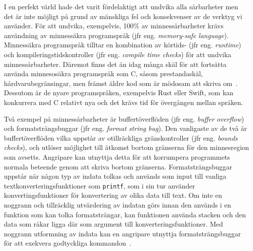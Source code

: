 I en perfekt värld hade det varit fördelaktigt att undvika alla sårbarheter men
det är inte möjligt på grund av mänskliga fel och konsekvenser av de verktyg vi
använder. För att undvika, exempelvis, 100\% av minnessårbarheter krävs
användning av minnessäkra programspråk (jfr eng. \emph{memory-safe language}).
Minnessäkra programspråk tilltar en kombination av körtids- (jfr eng.
\emph{runtime}) och kompileringstidskontroller (jfr eng. \emph{compile
    time checks}) för att undvika minnessårbarheter. Däremot finns det än idag
många skäl för att fortsätta använda minnesosäkra programspråk som C, såsom
prestandaskäl, hårdvarubegränsingar, men främst äldre kod som är mödosam att
skriva om~\cite{computer_security_cs161}. Dessutom är de nyare programspråken,
exempelvis Rust eller Swift, som kan konkurrera med C relativt nya och det
krävs tid för övergången mellan språken.

Två exempel på minnessårbarheter är buffertöverflöden (jfr eng. \emph{buffer
    overflow}) och formatsträngsbuggar (jfr eng. \emph{format string bug}). Den
vanligaste av de två är buffertöverflöden vilka uppstår av otillräckliga
gränskontroller (jfr eng. \emph{bounds checks}), och utlöser möjlighet till åtkomst bortom
gränserna för den minnesregion som avsetts. Angripare kan utnyttja detta för att korrumpera programmets
normala beteende genom att skriva bortom gränserna. Formatsträngsbuggar uppstår
när någon typ av indata tolkas och används som input till vanliga
textkonverteringsfunktioner som \texttt{printf}, som i sin tur använder
konvertingsfunktioner för konvertering av olika data till text. Om inte en
noggrann och tillräcklig utvärdering av indatan görs innan den används i en
funktion som kan tolka formatsträngar, kan funktionen använda stacken och den
data som råkar ligga där som argument till konverteringsfunktioner. Med noggrann
utformning av indata kan en angripare utnyttja formatsträngsbuggar för att
exekvera godtyckliga kommandon~\cite{computer_security_cs161}.




